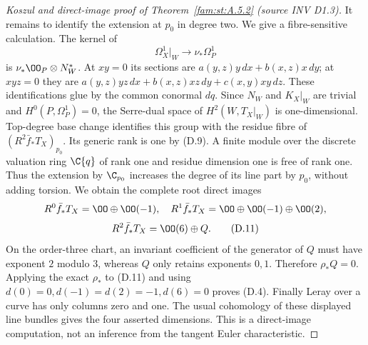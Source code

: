 \begin{proof}[Koszul and direct-image proof of Theorem~\ref{fam:st:A.5.2} (source INV D1.3)]
It remains to identify the extension at $p_0$ in degree two. We give
a fibre-sensitive calculation. The kernel of
\[
 \Omega_X^1|_W\longrightarrow\nu_*\Omega_P^1
\]
is $\nu_*\OO_P\otimes N_W^*$. At $xy=0$ its sections are
$a(y,z)y\,dx+b(x,z)x\,dy$; at $xyz=0$ they are
$a(y,z)yz\,dx+b(x,z)xz\,dy+c(x,y)xy\,dz$.
These identifications glue by the common conormal $dq$.
Since $N_W$ and $K_X|_W$ are trivial and $H^0(P,\Omega_P^1)=0$, the
Serre-dual space of $H^2(W,T_X|_W)$ is one-dimensional.
Top-degree base change identifies this group with the residue fibre
of $(R^2\bar f_*T_X)_{p_0}$. Its generic rank is one by (D.9).
A finite module over the discrete valuation ring $\C\{q\}$ of rank
one and residue dimension one is free of rank one. Thus the extension
by $\C_{p_0}$ increases the degree of its line part by $p_0$, without
adding torsion. We obtain the complete root direct images
\[
 R^0\bar f_*T_X=\OO\oplus\OO(-1),\quad
 R^1\bar f_*T_X=\OO\oplus\OO(-1)\oplus\OO(2),
\]
\[
 R^2\bar f_*T_X=\OO(6)\oplus Q.                       \tag{D.11}
\]
On the order-three chart, an invariant coefficient of the generator
of $Q$ must have exponent $2$ modulo $3$, whereas $Q$ only retains
exponents $0,1$. Therefore $\rho_*Q=0$. Applying the exact $\rho_*$
to (D.11) and using
$d(0)=0,d(-1)=d(2)=-1,d(6)=0$ proves (D.4).
Finally Leray over a curve has only columns zero and one. The usual
cohomology of these displayed line bundles gives the four asserted
dimensions. This is a direct-image computation, not an inference from
the tangent Euler characteristic.
\end{proof}

